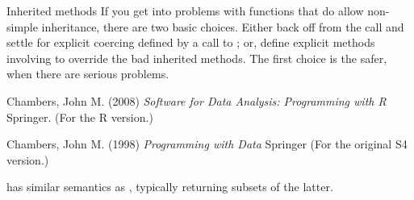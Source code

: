 \begin{Section}{Inherited methods}
If you get into problems with functions that do allow non-simple
inheritance, there are two basic choices.  Either
back off from the  call and settle for explicit coercing
defined by a call to ; or, define explicit
methods involving  to override the bad inherited
methods.  The first choice is the safer, when there are serious
problems.

\end{Section}
%
\begin{References}\relax
Chambers, John M. (2008)
\emph{Software for Data Analysis: Programming with R}
Springer.  (For the R version.)

Chambers, John M. (1998)
\emph{Programming with Data}
Springer (For the original S4 version.)
\end{References}
%
\begin{SeeAlso}\relax
{} has similar semantics as
, typically returning subsets of the latter.
\end{SeeAlso}
%
